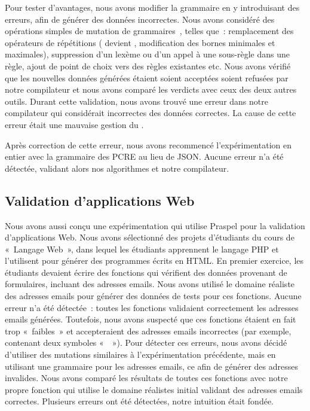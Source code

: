 Pour tester d'avantages, nous avons modifier la grammaire en y introduisant des
erreurs, afin de générer des données incorrectes. Nous avons considéré des
opérations simples de mutation de grammaires~, telles que~:
remplacement des opérateurs de répétitions (\code{+} devient \code{*},
modification des bornes minimales et maximales), suppression d'un lexème ou d'un
appel à une sous-règle dans une règle, ajout de point de choix vers des règles
existantes etc. Nous avons vérifié que les nouvelles données générées étaient
soient acceptées soient refusées par notre compilateur et nous avons comparé les
verdicts avec ceux des deux autres outils. Durant cette validation, nous avons
trouvé une erreur dans notre compilateur qui considérait incorrectes des données
correctes. La cause de cette erreur était une mauvaise gestion du
.

Après correction de cette erreur, nous avons recommencé l'expérimentation en
entier avec la grammaire des PCRE au lieu de JSON. Aucune erreur n'a été
détectée, validant alors nos algorithmes et notre compilateur.

\subsection{Validation d'applications Web}

Nous avons aussi conçu une expérimentation qui utilise Praspel pour la
validation d'applications Web. Nous avons sélectionné des projets d'étudiants du
cours de «~Langage Web~», dans lequel les étudiants apprennent le langage PHP et
l'utilisent pour générer des programmes écrits en HTML. En premier exercice, les
étudiants devaient écrire des fonctions qui vérifient des données provenant de
formulaires, incluant des adresses emails. Nous avons utilisé le domaine
réaliste des adresses emails pour générer des données de tests pour ces
fonctions. Aucune erreur n'a été détectée~: toutes les fonctions validaient
correctement les adresses emails générées. Toutefois, nous avons suspecté que
ces fonctions étaient en fait trop «~faibles~» et accepteraient des adresses
emails incorrectes (par exemple, contenant deux symboles «~~»). Pour
détecter ces erreurs, nous avons décidé d'utiliser des mutations similaires à
l'expérimentation précédente, mais en utilisant une grammaire pour les adresses
emails, ce afin de générer des adresses invalides. Nous avons comparé les
résultats de toutes ces fonctions avec notre propre fonction qui utilise le
domaine réalistes initial validant des adresses emails correctes. Plusieurs
erreurs ont été détectées, notre intuition était fondée.

